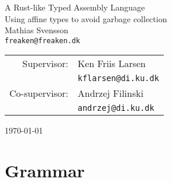




\begin{titlepage}
\begin{center}
\phantom{}
\vspace{5.0cm}
{\LARGE A Rust-like Typed Assembly Language}\\[0.5cm]
{\Large Using affine types to avoid garbage collection}\\[1.0cm]
{\large Mathias Svensson} \\
\texttt{freaken@freaken.dk} \\[0.8cm]
\begin{tabular}{rl}
Supervisor: & {\large Ken Friis Larsen} \\
            & \texttt{kflarsen@di.ku.dk} \\[0.5cm]
Co-supervisor: & {\large Andrzej Filinski} \\
               & \texttt{andrzej@di.ku.dk}
\end{tabular}

\vfill
{\large \today}
\end{center}
\end{titlepage}

\newpage
\tableofcontents
\newpage

\section{Grammar}

